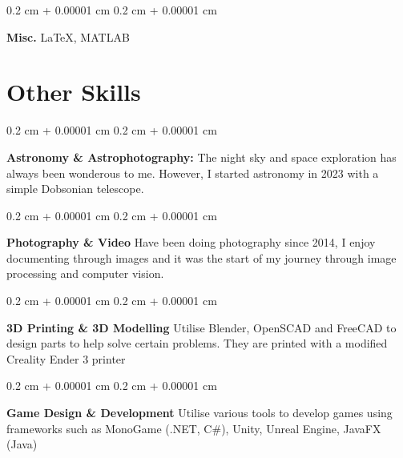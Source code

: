 \documentclass[10pt, letterpaper]{article}
\newenvironment{onecolentry}{
    \begin{adjustwidth}{
        0.2 cm + 0.00001 cm
    }{
        0.2 cm + 0.00001 cm
    }
}{
    \end{adjustwidth}
} %
\begin{document}
        \begin{onecolentry}
            \textbf{Misc.} LaTeX, MATLAB
        \end{onecolentry}


    \section{Other Skills}

        
        \begin{onecolentry}
            \textbf{Astronomy \& Astrophotography:} The night sky and space exploration has always been wonderous to me. 
                However, I started astronomy in 2023 with a simple Dobsonian telescope.
        \end{onecolentry}

        \vspace{0.2 cm}

        \begin{onecolentry}
            \textbf{Photography \& Video} Have been doing photography since 2014, I enjoy documenting through images and 
                it was the start of my journey through image processing and computer vision.
        \end{onecolentry}

        \vspace{0.2 cm}

        \begin{onecolentry}
            \textbf{3D Printing \& 3D Modelling} Utilise Blender, OpenSCAD and FreeCAD to design parts to help solve certain problems. 
                They are printed with a modified Creality Ender 3 printer
        \end{onecolentry}

        \vspace{0.2 cm}

        \begin{onecolentry}
            \textbf{Game Design \& Development} Utilise various tools to develop games using frameworks such as MonoGame (.NET, C\#), Unity, Unreal Engine, JavaFX (Java)
        \end{onecolentry}
    
\end{document}

